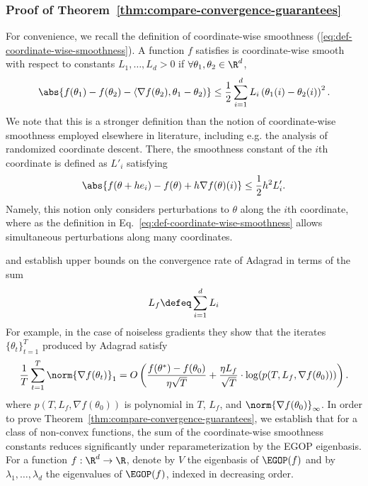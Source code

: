 \subsubsection{Proof of Theorem~\ref{thm:compare-convergence-guarantees}}\label{sec:proof-of-main-result}

For convenience, we recall the definition of coordinate-wise smoothness (\cref{eq:def-coordinate-wise-smoothness}). A function $f$ satisfies is coordinate-wise smooth with respect to constants $L_1,\dots,L_d > 0$ if $\forall \theta_1, \theta_2 \in \R^d$, 
\[
    \abs{f(\theta_1)-f(\theta_2) - \langle \nabla f(\theta_2), \theta_1 - \theta_2)} \leq \frac{1}{2}\sum_{i=1}^d L_i \left(\theta_1(i)-\theta_2(i)\right)^2.
\]
We note that this is a stronger definition than the notion of coordinate-wise smoothness employed elsewhere in literature, including e.g. the analysis of randomized coordinate descent. There, the smoothness constant of the $i$th coordinate is defined as $L'_i$ satisfying
\[
    \abs{f(\theta + h e_i) - f(\theta) + h \nabla f(\theta)(i)} \leq \frac{1}{2} h^2 L'_i.
\]
Namely, this notion only considers perturbations to $\theta$ along the $i$th coordinate, where as the definition in Eq.~\ref{eq:def-coordinate-wise-smoothness} allows simultaneous perturbations along many coordinates.

\citet{jiang2024convergence} and \citet{liu2024adagrad} establish upper bounds on the convergence rate of Adagrad in terms of the sum
\[
    L_f\defeq \sum_{i=1}^d L_i
\]
For example, in the case of noiseless gradients they show that the iterates $\{\theta_t\}_{t=1}^T$ produced by Adagrad satisfy
\begin{equation}\label{eq:jiang-fullbatch-gradient-guarantee}
    \frac{1}{T} \sum_{t=1}^T \norm{\nabla f(\theta_t)}_1  = O\left(\frac{f(\theta^*)-f(\theta_0)}{\eta \sqrt{T}} + \frac{\eta L_f}{\sqrt{T}}\cdot \log(p(T, L_f, \nabla f(\theta_0)))\right).
\end{equation}
where $p(T, L_f, \nabla f(\theta_0))$ is polynomial in $T$, $L_f$, and $\norm{\nabla f(\theta_0)}_\infty$. In order to prove Theorem~\ref{thm:compare-convergence-guarantees}, we establish that for a class of non-convex functions, the sum of the coordinate-wise smoothness constants reduces significantly under reparameterization by the EGOP eigenbasis. For a function $f:\R^d \rightarrow \R$, denote by $V$ the eigenbasis of $\EGOP(f)$ and by $\lambda_1,\dots, \lambda_d$ the eigenvalues of $\EGOP(f)$, indexed in decreasing order.

